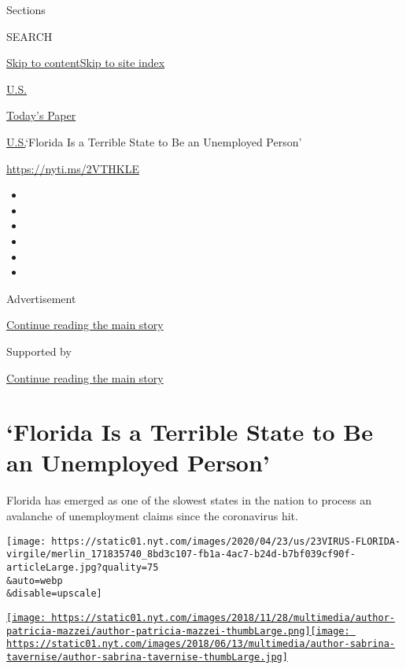 Sections

SEARCH

\protect\hyperlink{site-content}{Skip to
content}\protect\hyperlink{site-index}{Skip to site index}

\href{https://www.nytimes.com/section/us}{U.S.}

\href{https://myaccount.nytimes.com/auth/login?response_type=cookie\&client_id=vi}{}

\href{https://www.nytimes.com/section/todayspaper}{Today's Paper}

\href{/section/us}{U.S.}\textbar{}`Florida Is a Terrible State to Be an
Unemployed Person'

\url{https://nyti.ms/2VTHKLE}

\begin{itemize}
\item
\item
\item
\item
\item
\item
\end{itemize}

Advertisement

\protect\hyperlink{after-top}{Continue reading the main story}

Supported by

\protect\hyperlink{after-sponsor}{Continue reading the main story}

\hypertarget{florida-is-a-terrible-state-to-be-an-unemployed-person}{%
\section{`Florida Is a Terrible State to Be an Unemployed
Person'}\label{florida-is-a-terrible-state-to-be-an-unemployed-person}}

Florida has emerged as one of the slowest states in the nation to
process an avalanche of unemployment claims since the coronavirus hit.

\texttt{[image: https://static01.nyt.com/images/2020/04/23/us/23VIRUS-FLORIDA-virgile/merlin\_171835740\_8bd3c107-fb1a-4ac7-b24d-b7bf039cf90f-articleLarge.jpg?quality=75\\\&auto=webp\\\&disable=upscale]}

\href{https://www.nytimes.com/by/patricia-mazzei}{\texttt{[image: https://static01.nyt.com/images/2018/11/28/multimedia/author-patricia-mazzei/author-patricia-mazzei-thumbLarge.png]}}\href{https://www.nytimes.com/by/sabrina-tavernise}{\texttt{[image: https://static01.nyt.com/images/2018/06/13/multimedia/author-sabrina-tavernise/author-sabrina-tavernise-thumbLarge.jpg]}}

